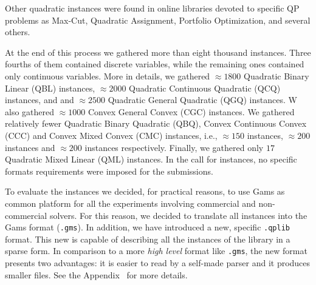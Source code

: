 Other quadratic instances were found in online libraries devoted to
specific QP problems as Max-Cut, Quadratic Assignment, Portfolio
Optimization, and several others.

At the end of this process we gathered more than eight thousand
instances. Three fourths of them contained discrete variables, while
the remaining ones contained only continuous variables. More in details,
we gathered $\approx 1800$ Quadratic Binary Linear (QBL) instances,
$\approx 2000$ Quadratic Continuous Quadratic (QCQ) instances, and
and $\approx 2500$ Quadratic General Quadratic (QGQ) instances. W
also gathered $\approx 1000$ Convex General Convex (CGC) instances. We
gathered relatively fewer Quadratic Binary Quadratic (QBQ), Convex
Continuous Convex (CCC) and Convex Mixed Convex (CMC) instances, i.e.,
$\approx 150$ instances, $\approx 200$ instances and $\approx 200$
instances respectively. Finally, we gathered only $17$ Quadratic Mixed
Linear (QML) instances. In the call for instances, no specific formats
requirements were imposed for the submissions.

To evaluate the instances we decided, for practical reasons, to use
Gams as common platform for all the experiments involving commercial and
non-commercial solvers. For this reason, we decided to translate all
instances into the Gams format (\texttt{.gms}). 
%
In addition, we have introduced a new, specific \texttt{.qplib} format. This
new is capable of describing all the instances of the library in a sparse form.
In comparison to a more \emph{high level} format like \texttt{.gms}, the new
format presents two advantages: it is easier to read by a self-made parser and
it produces smaller files. See the Appendix~\label{sec:format} for more details.


